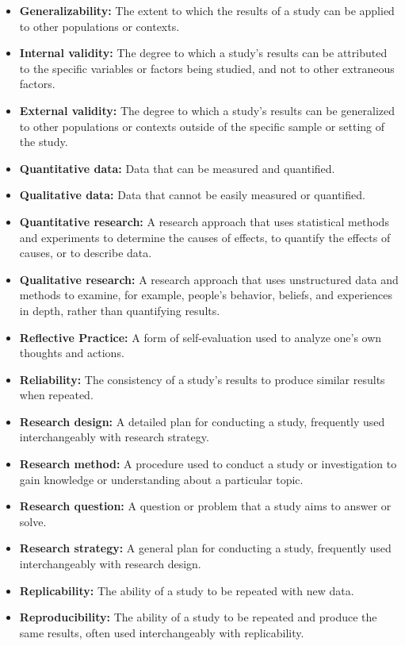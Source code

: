 \documentclass[
  12pt,
  oneside]{book}
\providecommand{\tightlist}{%
  \setlength{\itemsep}{0pt}\setlength{\parskip}{0pt}}
\theoremstyle{definition}
\theoremstyle{definition}
\theoremstyle{definition}
\theoremstyle{definition}
\theoremstyle{remark}
\begin{document}
\begin{itemize}
\tightlist
\item
  \textbf{Generalizability:} The extent to which the results of a study can be applied to other populations or contexts.
\item
  \textbf{Internal validity:} The degree to which a study's results can be attributed to the specific variables or factors being studied, and not to other extraneous factors.
\item
  \textbf{External validity:} The degree to which a study's results can be generalized to other populations or contexts outside of the specific sample or setting of the study.
\item
  \textbf{Quantitative data:} Data that can be measured and quantified.
\item
  \textbf{Qualitative data:} Data that cannot be easily measured or quantified.
\item
  \textbf{Quantitative research:} A research approach that uses statistical methods and experiments to determine the causes of effects, to quantify the effects of causes, or to describe data.
\item
  \textbf{Qualitative research:} A research approach that uses unstructured data and methods to examine, for example, people's behavior, beliefs, and experiences in depth, rather than quantifying results.
\item
  \textbf{Reflective Practice:} A form of self-evaluation used to analyze one's own thoughts and actions.
\item
  \textbf{Reliability:} The consistency of a study's results to produce similar results when repeated.
\item
  \textbf{Research design:} A detailed plan for conducting a study, frequently used interchangeably with research strategy.
\item
  \textbf{Research method:} A procedure used to conduct a study or investigation to gain knowledge or understanding about a particular topic.
\item
  \textbf{Research question:} A question or problem that a study aims to answer or solve.
\item
  \textbf{Research strategy:} A general plan for conducting a study, frequently used interchangeably with research design.
\item
  \textbf{Replicability:} The ability of a study to be repeated with new data.
\item
  \textbf{Reproducibility:} The ability of a study to be repeated and produce the same results, often used interchangeably with replicability.

\end{itemize}
\end{document}
